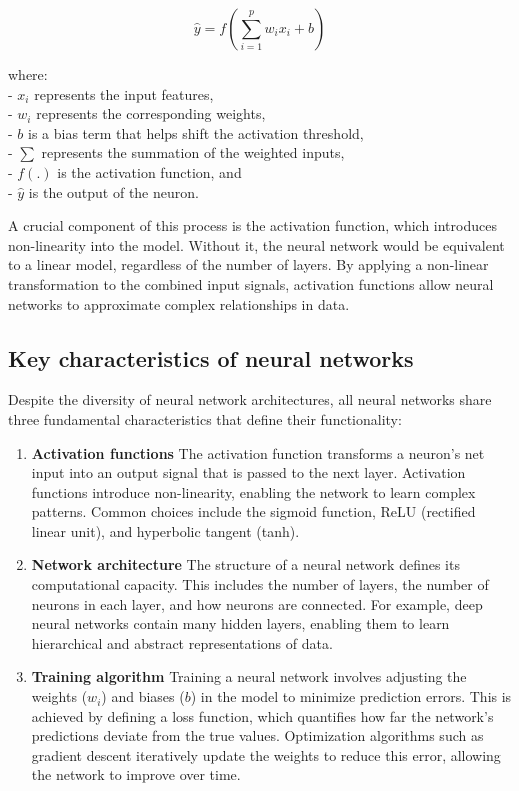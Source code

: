 \documentclass[
]{book}
\theoremstyle{definition}
\theoremstyle{definition}
\theoremstyle{definition}
\theoremstyle{definition}
\theoremstyle{remark}
\begin{document}
\[
\hat{y} = f\left( \sum_{i=1}^{p} w_i x_i + b \right)
\]

where:\\
- \(x_i\) represents the input features,\\
- \(w_i\) represents the corresponding weights,\\
- \(b\) is a bias term that helps shift the activation threshold,\\
- \(\sum\) represents the summation of the weighted inputs,\\
- \(f(.)\) is the activation function, and\\
- \(\hat{y}\) is the output of the neuron.

A crucial component of this process is the activation function, which introduces non-linearity into the model. Without it, the neural network would be equivalent to a linear model, regardless of the number of layers. By applying a non-linear transformation to the combined input signals, activation functions allow neural networks to approximate complex relationships in data.

\subsection*{Key characteristics of neural networks}\label{key-characteristics-of-neural-networks}

Despite the diversity of neural network architectures, all neural networks share three fundamental characteristics that define their functionality:

\begin{enumerate}
\def\labelenumi{\arabic{enumi}.}
\item
  \textbf{Activation functions} The activation function transforms a neuron's net input into an output signal that is passed to the next layer. Activation functions introduce non-linearity, enabling the network to learn complex patterns. Common choices include the sigmoid function, ReLU (rectified linear unit), and hyperbolic tangent (tanh).
\item
  \textbf{Network architecture} The structure of a neural network defines its computational capacity. This includes the number of layers, the number of neurons in each layer, and how neurons are connected. For example, deep neural networks contain many hidden layers, enabling them to learn hierarchical and abstract representations of data.
\item
  \textbf{Training algorithm} Training a neural network involves adjusting the weights (\(w_i\)) and biases (\(b\)) in the model to minimize prediction errors. This is achieved by defining a loss function, which quantifies how far the network's predictions deviate from the true values. Optimization algorithms such as gradient descent iteratively update the weights to reduce this error, allowing the network to improve over time.
\end{enumerate}
\end{document}
